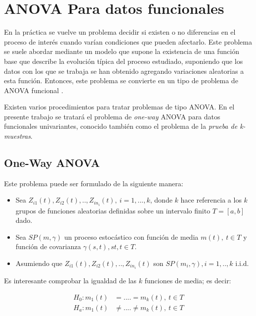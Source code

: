 \documentclass[
]{book}
\begin{document}
\hypertarget{anova-para-datos-funcionales}{%
\section{ANOVA Para datos funcionales}\label{anova-para-datos-funcionales}}

En la práctica se vuelve un problema decidir si existen o no diferencias en el proceso de interés cuando varían condiciones que pueden afectarlo. Este problema se suele abordar mediante un modelo que supone la existencia de una función base que describe la evolución típica del proceso estudiado, suponiendo que los datos con los que se trabaja se han obtenido agregando variaciones aleatorias a esta función. Entonces, este problema se convierte en un tipo de problema de ANOVA funcional \citep{cuesta}.

Existen varios procedimientos para tratar problemas de tipo ANOVA. En el presente trabajo se tratará el problema de \emph{one-way} ANOVA para datos funcionales univariantes, conocido también como el problema de la \emph{prueba de k-muestras}.

\hypertarget{one-way-anova}{%
\subsection{One-Way ANOVA}\label{one-way-anova}}

Este problema puede ser formulado de la siguiente manera:

\begin{itemize}
\item
  Sea \(Z_{i1}(t), Z_{i2}(t),..,Z_{in_i}(t),\ i=1,...,k\), donde \(k\) hace referencia a los \(k\) grupos de funciones aleatorias definidas sobre un intervalo finito \(T=[a,b]\) dado.
\item
  Sea \(SP(m,\gamma)\) un proceso estocástico con función de media \(m(t),\ t\in T\) y función de covarianza \(\gamma(s,t), st,t\in T\).
\item
  Asumiendo que \(Z_{i1}(t), Z_{i2}(t),..,Z_{in_i}(t)\) son \(SP(m_i,\gamma),i=1,..,k\) i.i.d.
\end{itemize}

Es interesante comprobar la igualdad de las \(k\) funciones de media; es decir:

\begin{align}
    H_0:m_1(t)&=....=m_k(t),\ t\in T\\
    H_a:m_1(t)&\neq....\neq m_k(t),\ t\in T
\end{align}
\end{document}
